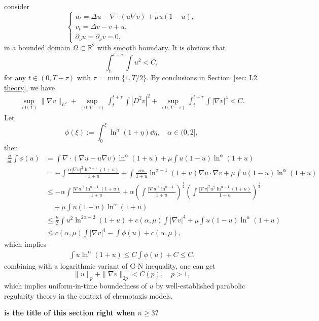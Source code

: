 consider 
\begin{equation}
	\begin{cases}
		u_t = \Delta u - \nabla\cdot(u\nabla v) + \mu u (1-u), \\
		v_t = \Delta v - v + u,\\
		\partial_\nu u = \partial_\nu v = 0,
	\end{cases}
\end{equation}
in a bounded domain $\Omega\subset\mathbb{R}^2$ with smooth boundary.
It is obvious that
\[
	\int_t^{t+\tau}\int u^2 < C,
\]
for any $t\in(0, T-\tau)$ with $\tau = \min\{1, T/2\}$.
By conclusions in Section~\ref{sec: L2 theory}, 
we have 
\begin{align*}
	\sup_{(0,T)}\|\nabla v\|_{L^2} 
	+ \sup_{(0,T-\tau)}\int_t^{t+\tau}\int |D^2v|^2 
	+ \sup_{(0, T-\tau)}\int_t^{t+\tau}\int |\nabla v|^4 < C.
\end{align*}
Let 
\[
	\phi(\xi) := \int_0^\xi \ln^\alpha(1+\eta) \dd\eta,\quad\alpha \in (0,2],
\]
then
\begin{align*}
	\frac{\dd}{\dd t}\int\phi(u)
	&= \int \nabla\cdot(\nabla u - u\nabla v) \ln^\alpha(1+u) + \mu\int u(1-u)\ln^\alpha(1+u)\\
	&= - \int \frac{\alpha|\nabla u|^2\ln^{\alpha-1}(1+u)}{1+u}
		+ \int \frac{\alpha u}{1+u} \ln^{\alpha-1}(1+u)\nabla u\cdot\nabla v  + \mu\int u(1-u)\ln^\alpha(1+u)\\
	&\leq - \alpha \int \frac{|\nabla u|^2\ln^{\alpha-1}(1+u)}{1+u}
		+ \alpha\left(\int \frac{|\nabla u|^2\ln^{\alpha-1}}{1+u}\right)^{\frac12}
			\left(\int \frac{|\nabla v|^2u^2\ln^{\alpha-1}(1+u)}{1+u}\right)^{\frac12}\\
	&\quad + \mu\int u(1-u)\ln^\alpha(1+u)\\
	&\leq \frac{\mu}{2}\int u^2\ln^{2\alpha-2}(1+u) + c(\alpha, \mu)\int|\nabla v|^4 
		+ \mu\int u(1-u)\ln^\alpha(1+u)\\
	&\leq c(\alpha, \mu)\int|\nabla v|^4 - \int\phi(u) + c(\alpha, \mu),
\end{align*}
which implies
\begin{align*}
	\int u\ln^\alpha(1+u) \leq C\int \phi(u) + C \leq C.
\end{align*}
combining with a logarithmic variant of G-N inequality, one can get 
\[
	\|u\|_p + \|\nabla v\|_{2p} < C(p), \quad p>1,
\]
which implies uniform-in-time boundedness of $u$ 
by well-established parabolic regularity theory in the context of chemotaxis models.

\textbf{is the title of this section right when $n\geq3$?}

